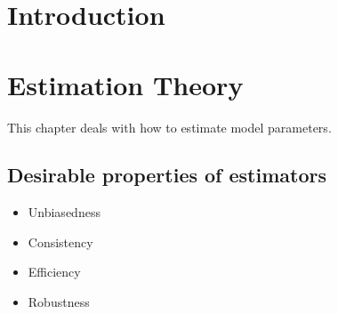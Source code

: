 \documentclass[a4paper]{book}
\begin{document}
\chapter*{Introduction}


\chapter{Estimation Theory}

This chapter deals with how to estimate model parameters. 

\section{Desirable properties of estimators}
\begin{itemize}
\item Unbiasedness 
\item Consistency
\item Efficiency
\item Robustness
\end{itemize}
\end{document}
